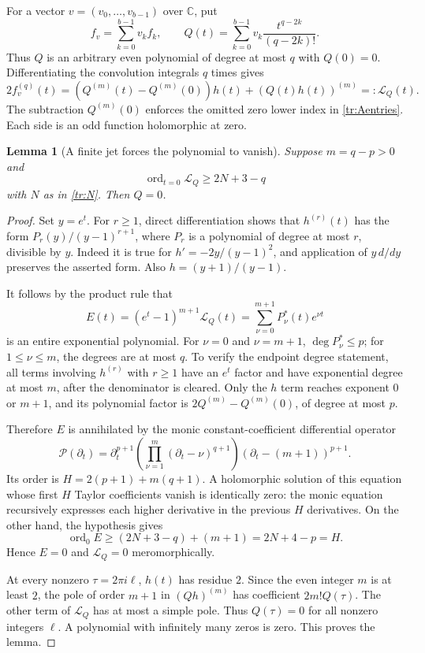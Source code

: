 \documentclass[11pt,a4paper]{article}
\numberwithin{equation}{section}
\newtheorem{lemma}[theorem]{Lemma}
\theoremstyle{definition}
\begin{document}
For a vector $v=(v_0,\ldots,v_{b-1})$ over $\mathbb C$, put
\[
 f_v=\sum_{k=0}^{b-1}v_kf_k,
 \qquad Q(t)=\sum_{k=0}^{b-1}v_k\frac{t^{q-2k}}{(q-2k)!}.
\]
Thus $Q$ is an arbitrary even polynomial of degree at most $q$ with
$Q(0)=0$. Differentiating the convolution integrals $q$ times gives
\begin{equation}\label{tr:operator}
 2f_v^{(q)}(t)
 =\left(Q^{(m)}(t)-Q^{(m)}(0)\right)h(t)
       +(Q(t)h(t))^{(m)}
 =:\mathcal L_Q(t).
\end{equation}
The subtraction $Q^{(m)}(0)$ enforces the omitted zero lower index in
\eqref{tr:Aentries}. Each side is an odd function holomorphic at zero.

\begin{lemma}[A finite jet forces the polynomial to vanish]
\label{tr:zerobound}
Suppose $m=q-p>0$ and
\[
 \operatorname{ord}_{t=0}\mathcal L_Q\ge2N+3-q
\]
with $N$ as in \eqref{tr:N}. Then $Q=0$.
\end{lemma}

\begin{proof}
Set $y=e^t$. For $r\ge1$, direct differentiation shows that
$h^{(r)}(t)$ has the form $P_r(y)/(y-1)^{r+1}$, where $P_r$ is a
polynomial of degree at most $r$, divisible by $y$. Indeed it is true
for $h'=-2y/(y-1)^2$, and application of $y\,d/dy$ preserves the
asserted form. Also $h=(y+1)/(y-1)$.

It follows by the product rule that
\[
 E(t)=(e^t-1)^{m+1}\mathcal L_Q(t)
     =\sum_{\nu=0}^{m+1}P_\nu^*(t)e^{\nu t}
\]
is an entire exponential polynomial. For $\nu=0$ and $\nu=m+1$,
$\deg P_\nu^*\le p$; for $1\le\nu\le m$, the degrees are at most
$q$. To verify the endpoint degree statement, all terms involving
$h^{(r)}$ with $r\ge1$ have an $e^t$ factor and have exponential
degree at most $m$, after the denominator is cleared. Only the
$h$ term reaches exponent $0$ or $m+1$, and its polynomial factor
is $2Q^{(m)}-Q^{(m)}(0)$, of degree at most $p$.

Therefore $E$ is annihilated by the monic constant-coefficient
differential operator
\begin{equation}\label{tr:ode}
 \mathcal P(\partial_t)=
 \partial_t^{p+1}
 \left(\prod_{\nu=1}^{m}(\partial_t-\nu)^{q+1}\right)
 (\partial_t-(m+1))^{p+1}.
\end{equation}
Its order is
$H=2(p+1)+m(q+1)$. A holomorphic solution of this equation whose
first $H$ Taylor coefficients vanish is identically zero: the monic
equation recursively expresses each higher derivative in the previous
$H$ derivatives. On the other hand, the hypothesis gives
\[
 \operatorname{ord}_0E\ge(2N+3-q)+(m+1)
    =2N+4-p=H.
\]
Hence $E=0$ and $\mathcal L_Q=0$ meromorphically.

At every nonzero $\tau=2\pi i\ell$, $h(t)$ has residue $2$.
Since the even integer $m$ is at least $2$, the pole of order $m+1$
in $(Qh)^{(m)}$ has coefficient $2m!Q(\tau)$. The other term of
$\mathcal L_Q$ has at most a simple pole. Thus $Q(\tau)=0$ for all
nonzero integers $\ell$. A polynomial with infinitely many zeros is
zero. This proves the lemma.
\end{proof}
\end{document}
